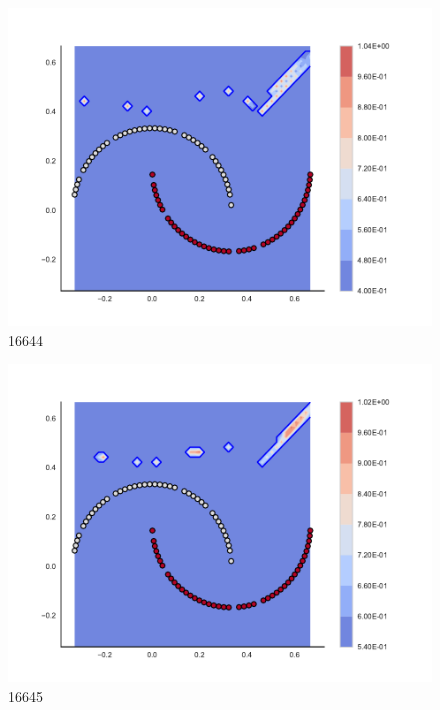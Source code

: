 \begin{subfigure}[b]{0.09\textwidth}
    \includegraphics[clip, trim=2.35cm 1.75cm 4.5cm 0cm,width=\textwidth]{img/convergence/16644.pdf}
    \caption{16644}
    \label{fig:convergence_16644}
\end{subfigure}
%
\begin{subfigure}[b]{0.09\textwidth}
    \includegraphics[clip, trim=2.35cm 1.75cm 4.5cm 0cm,width=\textwidth]{img/convergence/16645.pdf}
    \caption{16645}
    \label{fig:convergence_16645}
\end{subfigure}
%
